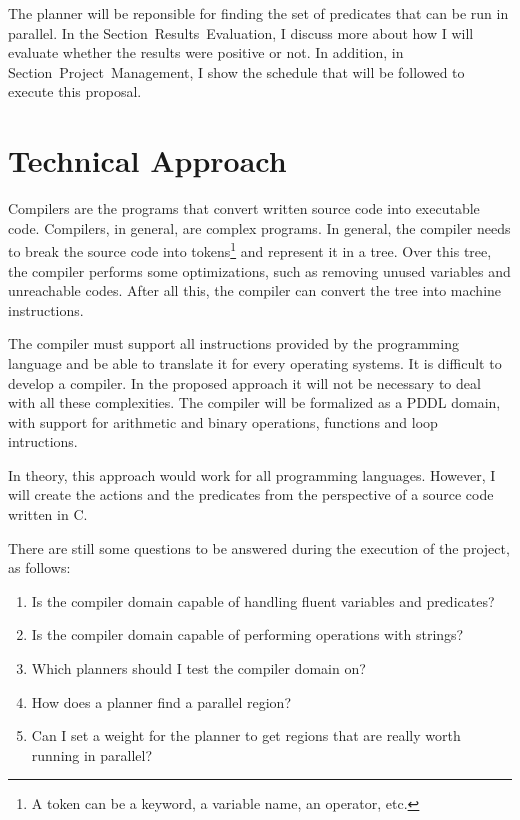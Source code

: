 \documentclass[letterpaper]{article}
\begin{document}
The planner will be reponsible for finding the set of predicates that can be run in parallel. In the Section~Results~Evaluation, I discuss more about how I will evaluate whether the results were positive or not. In addition, in Section~Project~Management, I show the schedule that will be followed to execute this proposal.


\section{Technical Approach}

Compilers are the programs that convert written source code into executable code. Compilers, in general, are complex programs. In general, the compiler needs to break the source code into tokens\footnote{A token can be a keyword, a variable name, an operator, etc.} and represent it in a tree. Over this tree, the compiler performs some optimizations, such as removing unused variables and unreachable codes. After all this, the compiler can convert the tree into machine instructions.

The compiler must support all instructions provided by the programming language and be able to translate it for every operating systems. It is difficult to develop a compiler. In the proposed approach it will not be necessary to deal with all these complexities. The compiler will be formalized as a PDDL domain, with support for arithmetic and binary operations, functions and loop intructions.

In theory, this approach would work for all programming languages. However, I will create the actions and the predicates from the perspective of a source code written in C.

There are still some questions to be answered during the execution of the project, as follows:

\begin{enumerate}
  \item Is the compiler domain capable of handling fluent variables and predicates?
  \item Is the compiler domain capable of performing operations with strings?
  \item Which planners should I test the compiler domain on?
  \item How does a planner find a parallel region?
  \item Can I set a weight for the planner to get regions that are really worth running in parallel?
\end{enumerate}
\end{document}
